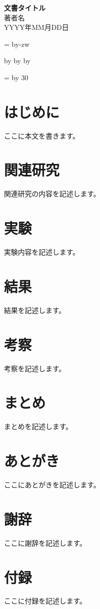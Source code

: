 \documentclass[a4paper,10.5pt]{jsarticle}
\makeatletter
\def\mojiparline#1{
    \newcounter{mpl}
    \setcounter{mpl}{#1}
    \@tempdima=\linewidth
    \advance\@tempdima by-\value{mpl}zw
    \addtocounter{mpl}{-1}
    \divide\@tempdima by \value{mpl}
    \advance\kanjiskip by\@tempdima
    \advance\parindent by\@tempdima
}
\def\linesparpage#1{
    \baselineskip=\textheight
    \divide\baselineskip by #1
}
\makeatother
\begin{document}
\begin{titlepage}
    \centering
    \vspace*{\fill}
    {\Huge\bfseries 文書タイトル} \\[2cm]
    {\large 著者名} \\[0.5cm]
    \vspace*{\fill}
    {\large YYYY年MM月DD日} %
\end{titlepage}

\tableofcontents
\newpage
{} %
\mojiparline{40}
\linesparpage{30}

\section{はじめに}
ここに本文を書きます。

\section{関連研究}
関連研究の内容を記述します。

\section{実験}
実験内容を記述します。

\section{結果}
結果を記述します。

\section{考察}
考察を記述します。

\section{まとめ}
まとめを記述します。

\newpage




\newpage
\section*{あとがき}
ここにあとがきを記述します。

\newpage
\section*{謝辞}
ここに謝辞を記述します。

\newpage
\section*{付録}
ここに付録を記述します。
\end{document}
